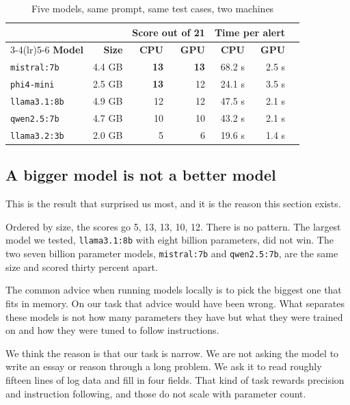 \documentclass[11pt,a4paper]{article}
\newcommand{\best}[1]{\textbf{#1}}
\begin{document}
\begin{table}[h]
\centering
\small
\caption{Five models, same prompt, same test cases, two machines}
\begin{tabular}{@{}lrrrrrr@{}}
\toprule
& & \multicolumn{2}{c}{\textbf{Score out of 21}} & \multicolumn{2}{c}{\textbf{Time per alert}} \\
\cmidrule(lr){3-4}\cmidrule(lr){5-6}
\textbf{Model} & \textbf{Size} & \textbf{CPU} & \textbf{GPU} & \textbf{CPU} & \textbf{GPU} \\
\midrule
\texttt{mistral:7b}   & 4.4 GB & \best{13} & \best{13} & 68.2 s & 2.5 s \\
\texttt{phi4-mini}    & 2.5 GB & \best{13} & 12        & 24.1 s & 3.5 s \\
\texttt{llama3.1:8b}  & 4.9 GB & 12        & 12        & 47.5 s & 2.1 s \\
\texttt{qwen2.5:7b}   & 4.7 GB & 10        & 10        & 43.2 s & 2.1 s \\
\texttt{llama3.2:3b}  & 2.0 GB & 5         & 6         & 19.6 s & 1.4 s \\
\bottomrule
\end{tabular}
\end{table}

\subsection{A bigger model is not a better model}

This is the result that surprised us most, and it is the reason this section exists.

Ordered by size, the scores go 5, 13, 13, 10, 12. There is no pattern. The largest
model we tested, \texttt{llama3.1:8b} with eight billion parameters, did not win. The
two seven billion parameter models, \texttt{mistral:7b} and \texttt{qwen2.5:7b}, are
the same size and scored thirty percent apart.

The common advice when running models locally is to pick the biggest one that fits
in memory. On our task that advice would have been wrong. What separates these
models is not how many parameters they have but what they were trained on and how
they were tuned to follow instructions.

We think the reason is that our task is narrow. We are not asking the model to write
an essay or reason through a long problem. We ask it to read roughly fifteen lines of
log data and fill in four fields. That kind of task rewards precision and instruction
following, and those do not scale with parameter count.
\end{document}
